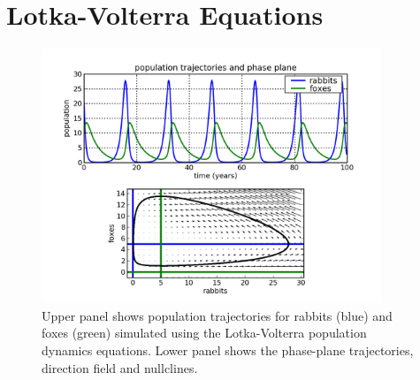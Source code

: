 \section{Lotka-Volterra Equations}
\label{sec:lotka_volterra}



\begin{figure}
\begin{centering}\includegraphics[width=4in]{fig/lotka_volterra}\par\end{centering}

\caption{\label{fig:lotka_volterra}Upper panel shows population
  trajectories for rabbits (blue) and foxes (green) simulated using
  the Lotka-Volterra population dynamics equations.  Lower panel shows
  the phase-plane trajectories, direction field and nullclines.}
\end{figure}

